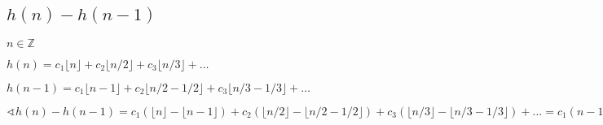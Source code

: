 \documentclass[12pt,a4paper, flushleft]{article}
\newcommand{\fl}[1]{\lfloor #1 \rfloor}
\begin{document}
\subsection{$h(n) - h(n-1)$}

$n\in\mathds{Z}$

$h(n) = c_1\fl n + c_2 \fl{n/2} + c_3 \fl{n/3} + \dots$

$h(n-1) = c_1\fl {n-1} + c_2 \fl{n/2 - 1/2} + c_3 \fl{n/3 - 1/3} + \dots$

$\sphericalangle h(n) - h(n-1) = c_1(\fl n - \fl{n-1}) + c_2(\fl{n/2} - \fl{n/2 - 1/2}) + c_3(\fl{n/3} - \fl{n/3 - 1/3}) + \dots = c_1(n-1+1) + c_2()$
\end{document}

